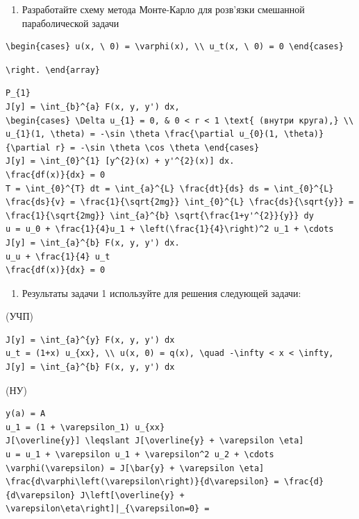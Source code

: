 \documentclass[
  ukrainian,
]{article}
\providecommand{\tightlist}{%
  \setlength{\itemsep}{0pt}\setlength{\parskip}{0pt}}
\begin{document}
\begin{enumerate}
\def\labelenumi{\arabic{enumi}.}
\setcounter{enumi}{4}
\tightlist
\item
  Разработайте схему метода Монте-Карло для розв'язки смешанной
  параболической задачи
\end{enumerate}

\begin{verbatim}
\begin{cases} u(x, \ 0) = \varphi(x), \\ u_t(x, \ 0) = 0 \end{cases}
\end{verbatim}

\begin{verbatim}
\right. \end{array}
\end{verbatim}

\begin{verbatim}
P_{1}
J[y] = \int_{b}^{a} F(x, y, y') dx,
\begin{cases} \Delta u_{1} = 0, & 0 < r < 1 \text{ (внутри круга),} \\ u_{1}(1, \theta) = -\sin \theta \frac{\partial u_{0}(1, \theta)}{\partial r} = -\sin \theta \cos \theta \end{cases}
J[y] = \int_{0}^{1} [y^{2}(x) + y'^{2}(x)] dx.
\frac{df(x)}{dx} = 0
T = \int_{0}^{T} dt = \int_{a}^{L} \frac{dt}{ds} ds = \int_{0}^{L} \frac{ds}{v} = \frac{1}{\sqrt{2mg}} \int_{0}^{L} \frac{ds}{\sqrt{y}} = \frac{1}{\sqrt{2mg}} \int_{a}^{b} \sqrt{\frac{1+y'^{2}}{y}} dy
u = u_0 + \frac{1}{4}u_1 + \left(\frac{1}{4}\right)^2 u_1 + \cdots
J[y] = \int_{a}^{b} F(x, y, y') dx.
u_u + \frac{1}{4} u_t
\frac{df(x)}{dx} = 0
\end{verbatim}

\begin{enumerate}
\def\labelenumi{\arabic{enumi}.}
\setcounter{enumi}{1}
\tightlist
\item
  Результаты задачи 1 используйте для решения следующей задачи:
\end{enumerate}

(УЧП)

\begin{verbatim}
J[y] = \int_{a}^{y} F(x, y, y') dx
u_t = (1+x) u_{xx}, \\ u(x, 0) = q(x), \quad -\infty < x < \infty,
J[y] = \int_{a}^{b} F(x, y, y') dx
\end{verbatim}

(НУ)

\begin{verbatim}
y(a) = A
u_1 = (1 + \varepsilon_1) u_{xx}
J[\overline{y}] \leqslant J[\overline{y} + \varepsilon \eta]
u = u_1 + \varepsilon u_1 + \varepsilon^2 u_2 + \cdots
\varphi(\varepsilon) = J[\bar{y} + \varepsilon \eta]
\frac{d\varphi\left(\varepsilon\right)}{d\varepsilon} = \frac{d}{d\varepsilon} J\left[\overline{y} + \varepsilon\eta\right]|_{\varepsilon=0} =
\end{verbatim}
\end{document}
